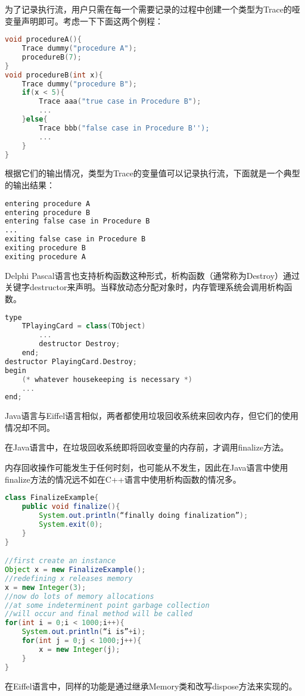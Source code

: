为了记录执行流，用户只需在每一个需要记录的过程中创建一个类型为Trace的哑变量声明即可。考虑一下下面这两个例程：




\begin{lstlisting}[language=C++]
void procedureA(){
	Trace dummy("procedure A");
	procedureB(7);
}
void procedureB(int x){
	Trace dummy("procedure B");
	if(x < 5){
		Trace aaa("true case in Procedure B");
		...
	}else{
		Trace bbb("false case in Procedure B'');
		...
	}
}
\end{lstlisting}

根据它们的输出情况，类型为Trace的变量值可以记录执行流，下面就是一个典型的输出结果：



\begin{lstlisting}[language=bash]
entering procedure A
entering procedure B
entering false case in Procedure B
...
exiting false case in Procedure B
exiting procedure B
exiting procedure A
\end{lstlisting}

Delphi Pascal语言也支持析构函数这种形式，析构函数（通常称为Destroy）通过关键字destructor来声明。当释放动态分配对象时，内存管理系统会调用析构函数。



\begin{lstlisting}[language=C++]
type
	TPlayingCard = class(TObject)
		...	
		destructor Destroy;
	end;
destructor PlayingCard.Destroy;
begin
	(* whatever housekeeping is necessary *)
	...
end;
\end{lstlisting}


Java语言与Eiffel语言相似，两者都使用垃圾回收系统来回收内存，但它们的使用情况却不同。

\begin{compactitem}
\item 在Java语言中，在垃圾回收系统即将回收变量的内存前，才调用finalize方法。

内存回收操作可能发生于任何时刻，也可能从不发生，因此在Java语言中使用finalize方法的情况远不如在C++语言中使用析构函数的情况多。


\begin{lstlisting}[language=Java]
class FinalizeExample{
	public void finalize(){
		System.out.println(“finally doing finalization”);
		System.exit(0);
	}
}

//first create an instance
Object x = new FinalizeExample();
//redefining x releases memory
x = new Integer(3);
//now do lots of memory allocations
//at some indeterminent point garbage collection
//will occur and final method will be called
for(int i = 0;i < 1000;i++){
	System.out.println(“i is”+i);
	for(int j = 0;j < 1000;j++){
		x = new Integer(j);
	}
}
\end{lstlisting}

\item 在Eiffel语言中，同样的功能是通过继承Memory类和改写dispose方法来实现的。
\end{compactitem}



